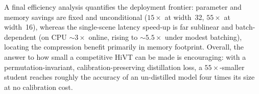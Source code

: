 A final efficiency analysis quantifies the deployment frontier: parameter and
memory savings are fixed and unconditional ($15\times$ at width~32, $55\times$ at
width~16), whereas the single-scene latency speed-up is far sublinear and
batch-dependent (on CPU $\sim\!3\times$ online, rising to $\sim\!5.5\times$ under
modest batching), locating the compression benefit primarily in memory footprint.
Overall, the answer to how small a competitive HiVT can be made is encouraging:
with a permutation-invariant, calibration-preserving distillation loss, a
$55\times$-smaller student reaches roughly the accuracy of an un-distilled model
four times its size at no calibration cost.
